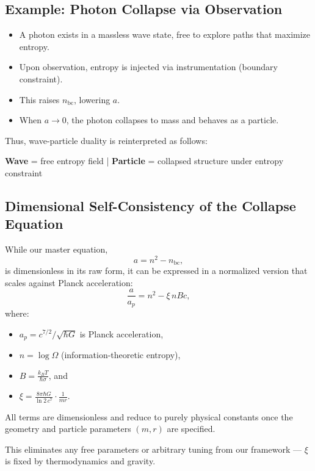 \documentclass[12pt]{article}
\begin{document}
\subsection{Example: Photon Collapse via Observation}

\begin{itemize}
    \item A photon exists in a massless wave state, free to explore paths that maximize entropy.
    \item Upon observation, entropy is injected via instrumentation (boundary constraint).
    \item This raises $n_{\text{bc}}$, lowering $a$.
    \item When $a \to 0$, the photon collapses to mass and behaves as a particle.
\end{itemize}

\noindent
Thus, wave-particle duality is reinterpreted as follows:

\begin{center}
\textbf{Wave} = free entropy field \quad | \quad \textbf{Particle} = collapsed structure under entropy constraint
\end{center}

\subsection*{Dimensional Self-Consistency of the Collapse Equation}

While our master equation,
\[
a = n^2 - n_{\text{bc}},
\]
is dimensionless in its raw form, it can be expressed in a normalized version that scales against Planck acceleration:
\[
\frac{a}{a_p} = n^2 - \xi \, n B c,
\]
where:
\begin{itemize}
    \item $a_p = c^{7/2}/\sqrt{\hbar G}$ is Planck acceleration,
    \item $n = \log \Omega$ (information-theoretic entropy),
    \item $B = \frac{k_B T}{\hbar \sigma}$, and
    \item $\xi = \frac{8\pi \hbar G}{\ln 2 \, c^7} \cdot \frac{1}{m r}$.
\end{itemize}

All terms are dimensionless and reduce to purely physical constants once the geometry and particle parameters $(m, r)$ are specified.

This eliminates any free parameters or arbitrary tuning from our framework — $\xi$ is fixed by thermodynamics and gravity.
\end{document}
